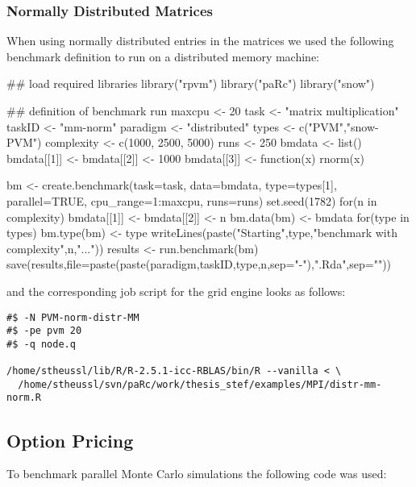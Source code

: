 \subsubsection{Normally Distributed Matrices}

When using normally distributed entries in the matrices we used the
following benchmark definition to run on a distributed memory machine:

\begin{Scode}
## load required libraries
library("rpvm")
library("paRc")
library("snow")

## definition of benchmark run
maxcpu <- 20
task <- "matrix multiplication"
taskID <- "mm-norm"
paradigm <- "distributed"
types <- c("PVM","snow-PVM")
complexity <- c(1000, 2500, 5000)
runs <- 250
bmdata <- list()
bmdata[[1]] <- bmdata[[2]] <- 1000
bmdata[[3]] <- function(x){
  rnorm(x)
}

bm <- create.benchmark(task=task, data=bmdata,
                       type=types[1], parallel=TRUE, cpu_range=1:maxcpu, runs=runs)
set.seed(1782)
for(n in complexity){
  bmdata[[1]] <- bmdata[[2]] <- n
  bm.data(bm) <- bmdata
  for(type in types){
    bm.type(bm) <- type
    writeLines(paste("Starting",type,"benchmark with complexity",n,"..."))
    results <- run.benchmark(bm)
    save(results,file=paste(paste(paradigm,taskID,type,n,sep="-"),".Rda",sep=""))
  }
}
\end{Scode}

and the corresponding job script for the grid engine looks as follows:

\begin{verbatim}
#$ -N PVM-norm-distr-MM
#$ -pe pvm 20
#$ -q node.q

/home/stheussl/lib/R/R-2.5.1-icc-RBLAS/bin/R --vanilla < \
  /home/stheussl/svn/paRc/work/thesis_stef/examples/MPI/distr-mm-norm.R
\end{verbatim}

\subsection{Option Pricing}

To benchmark parallel Monte Carlo simulations the following code was
used:

